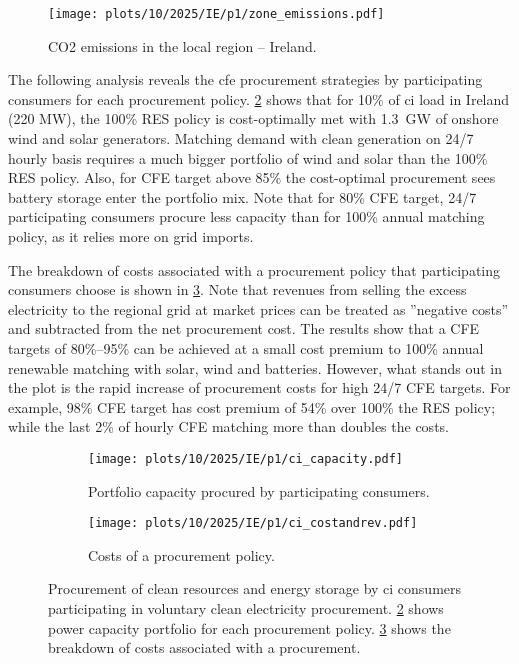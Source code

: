 \begin{figure}
    \centering
    \texttt{[image: plots/10/2025/IE/p1/zone\_emissions.pdf]}
    \caption{CO2 emissions in the local region -- Ireland.}
    \label{fig:10-2025-IE-p1-zone_emissions}
\end{figure}

The following analysis reveals the \gls{cfe} procurement strategies by participating consumers for each procurement policy.
\cref{fig:10-2025-IE-p1-ci_capacity} shows that for 10\% of \gls{ci} load in Ireland (220 MW), the 100\% RES policy is cost-optimally met with 1.3~GW of onshore wind and solar generators.
Matching demand with clean generation on 24/7 hourly basis requires a much bigger portfolio of wind and solar than the 100\% RES policy.
Also, for CFE target above 85\% the cost-optimal procurement sees battery storage enter the portfolio mix.
Note that for 80\% CFE target, 24/7 participating consumers procure less capacity than for 100\% annual matching policy, as it relies more on grid imports.

The breakdown of costs associated with a procurement policy that participating consumers choose is shown in \cref{fig:10-2025-IE-p1-ci_costandrev}.
Note that revenues from selling the excess electricity to the regional grid at market prices can be treated as ”negative costs” and subtracted from the net procurement cost.
The results show that a CFE targets of 80\%--95\% can be achieved at a small cost premium to 100\% annual renewable matching with solar, wind and batteries.
However, what stands out in the plot is the rapid increase of procurement costs for high 24/7 CFE targets. 
For example, 98\% CFE target has cost premium of 54\% over 100\% the RES policy; while the last 2\% of hourly CFE matching more than doubles the costs.

\begin{figure}
    \centering
    \begin{subfigure}[t]{\columnwidth}
        \centering
        \caption{Portfolio capacity procured by participating consumers.}
        \texttt{[image: plots/10/2025/IE/p1/ci\_capacity.pdf]}
        \label{fig:10-2025-IE-p1-ci_capacity}
    \end{subfigure}
    \begin{subfigure}[t]{\columnwidth}
        \centering
        \vspace{-0.5cm}
        \caption{Costs of a procurement policy.}
        \texttt{[image: plots/10/2025/IE/p1/ci\_costandrev.pdf]}
        \label{fig:10-2025-IE-p1-ci_costandrev}
    \end{subfigure}
    \caption{Procurement of clean resources and energy storage by \gls{ci} consumers participating in voluntary clean electricity procurement. 
    \cref{fig:10-2025-IE-p1-ci_capacity} shows power capacity portfolio for each procurement policy.
    \cref{fig:10-2025-IE-p1-ci_costandrev} shows the breakdown of costs associated with a procurement.}
    \label{fig:10-2025-IE-p1-ci_procurement}
\end{figure}


